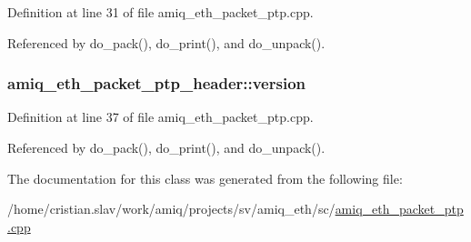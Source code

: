 Definition at line 31 of file amiq\_\-eth\_\-packet\_\-ptp.cpp.

Referenced by do\_\-pack(), do\_\-print(), and do\_\-unpack().\hypertarget{classamiq__eth__packet__ptp__header_a6d5c2946688a068e73a6878edf967644}{
\subsubsection[{version}]{ {\bf amiq\_\-eth\_\-packet\_\-ptp\_\-header::version}}}
\label{classamiq__eth__packet__ptp__header_a6d5c2946688a068e73a6878edf967644}


Definition at line 37 of file amiq\_\-eth\_\-packet\_\-ptp.cpp.

Referenced by do\_\-pack(), do\_\-print(), and do\_\-unpack().

The documentation for this class was generated from the following file:\begin{DoxyCompactItemize}
\item 
/home/cristian.slav/work/amiq/projects/sv/amiq\_\-eth/sc/\hyperlink{amiq__eth__packet__ptp_8cpp}{amiq\_\-eth\_\-packet\_\-ptp.cpp}\end{DoxyCompactItemize}

